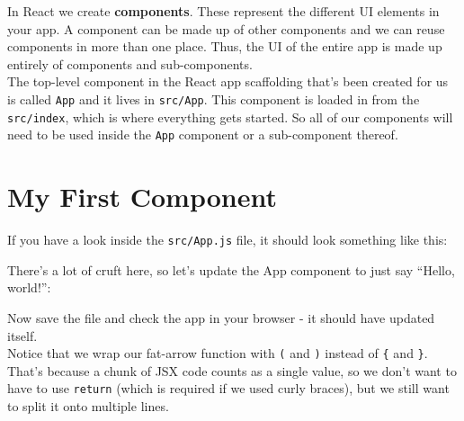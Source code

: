 In React we create \textbf{components}. These represent the different UI elements in your app. A component can be made up of other components and we can reuse components in more than one place. Thus, the UI of the entire app is made up entirely of components and sub-components.
\\

The top-level component in the React app scaffolding that's been created for us is called \texttt{App} and it lives in \texttt{src/App}. This component is loaded in from the \texttt{src/index}, which is where everything gets started. So all of our components will need to be used inside the \texttt{App} component or a sub-component thereof.


\pagebreak


\section{My First Component}

If you have a look inside the \texttt{src/App.js} file, it should look something like this:


There's a lot of cruft here, so let's update the App component to just say ``Hello, world!'':


Now save the file and check the app in your browser - it should have updated itself.
\\

Notice that we wrap our fat-arrow function with \texttt{(} and \texttt{)} instead of \texttt{\{} and \texttt{\}}. That's because a chunk of JSX code counts as a single value, so we don't want to have to use \texttt{return} (which is required if we used curly braces), but we still want to split it onto multiple lines.
\\

